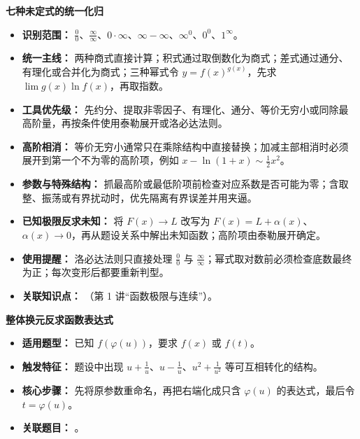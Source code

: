 
\begin{knowledgeBox}
\textbf{七种未定式的统一化归}

\begin{itemize}
  \item \textbf{识别范围：} \(\frac00\)、\(\frac{\infty}{\infty}\)、\(0\cdot\infty\)、\(\infty-\infty\)、\(\infty^0\)、\(0^0\)、\(1^\infty\)。
  \item \textbf{统一主线：} 两种商式直接计算；积式通过取倒数化为商式；差式通过通分、有理化或合并化为商式；三种幂式令 \(y=f(x)^{g(x)}\)，先求 \(\lim g(x)\ln f(x)\)，再取指数。
  \item \textbf{工具优先级：} 先约分、提取非零因子、有理化、通分、等价无穷小或同除最高阶量，再按条件使用泰勒展开或洛必达法则。
  \item \textbf{高阶相消：} 等价无穷小通常只在乘除结构中直接替换；加减主部相消时必须展开到第一个不为零的高阶项，例如 \(x-\ln(1+x)\sim\frac12x^2\)。
  \item \textbf{参数与特殊结构：} 抓最高阶或最低阶项前检查对应系数是否可能为零；含取整、振荡或有界扰动时，优先隔离有界误差并用夹逼。
  \item \textbf{已知极限反求未知：} 将 \(F(x)\to L\) 改写为 \(F(x)=L+\alpha(x)\)、\(\alpha(x)\to0\)，再从题设关系中解出未知函数；高阶项由泰勒展开确定。
  \item \textbf{使用提醒：} 洛必达法则只直接处理 \(\frac00\) 与 \(\frac{\infty}{\infty}\)；幂式取对数前必须检查底数最终为正；每次变形后都要重新判型。
  \item \textbf{关联知识点：} （第 1 讲“函数极限与连续”）。
\end{itemize}

\textbf{整体换元反求函数表达式}

\begin{itemize}
  \item \textbf{适用题型：} 已知 \(f(\varphi(u))\)，要求 \(f(x)\) 或 \(f(t)\)。
  \item \textbf{触发特征：} 题设中出现 \(u+\frac{1}{u}\)、\(u-\frac{1}{u}\)、\(u^2+\frac{1}{u^2}\) 等可互相转化的结构。
  \item \textbf{核心步骤：} 先将原参数重命名，再把右端化成只含 \(\varphi(u)\) 的表达式，最后令 \(t=\varphi(u)\)。
  \item \textbf{关联题目：} 。
\end{itemize}


\end{knowledgeBox}

